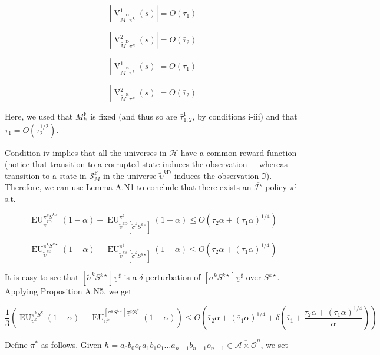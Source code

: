 \documentclass[a4paper]{article}
\newcommand{\Comment}[1]{}
\newcommand{\AP}[1]{\left(#1\right)}
\newcommand{\AB}[1]{\left[#1\right]}
\newcommand{\Abs}[1]{\left\vert #1 \right\vert}
\newcommand{\Ob}{\mathcal{O}}
\newcommand{\A}{\mathcal{A}}
\newcommand{\St}{\mathcal{S}}
\newcommand{\In}{\mathcal{I}}
\newcommand{\Hy}{\mathcal{H}}
\newcommand{\RMD}{\mathrm{D}}
\newcommand{\RME}{\mathrm{E}}
\newcommand{\RMF}{\mathrm{F}}
\newcommand{\SF}{\St^{\RMF}}
\newcommand{\V}{\operatorname{V}}
\newcommand{\EU}{\operatorname{EU}}
\begin{document}
$$\Abs{\V_{\tilde{M}^\RMD\pi^k}^1(s)} = O\AP{\bar{\tau}_1}$$

$$\Abs{\V_{\tilde{M}^\RMD\pi^k}^2(s)} = O\AP{\bar{\tau}_2}$$

$$\Abs{\V_{\tilde{M}^\RME\pi^k}^1(s)} = O\AP{\bar{\tau}_1}$$

$$\Abs{\V_{\tilde{M}^\RME\pi^k}^2(s)} = O\AP{\bar{\tau}_2}$$

Here, we used that $M^\RMF_k$ is fixed (and thus so are $\bar{\tau}_{1,2}^\RMF$, by conditions i-iii) and that $\bar{\tau}_1 = O\AP{\bar{\tau}_2^{1/2}}$.

Condition iv implies that all the universes in $\Hy$ have a common reward function (notice that transition to a corrupted state induces the observation $\bot$ whereas transition to a state in $\SF_M$ in the universe $\tilde{\upsilon}^{k\RMD}$ induces the observation $\Im$). Therefore, we can use Lemma A.N1 to conclude that there exists an $\overline{\In^\star}$-policy $\pi^\sharp$ s.t.

$$\EU_{\tilde{\upsilon}^{k\RMD}}^{\pi^kS^{k\star}}(1-\alpha) - \EU_{\overline{\tilde{\upsilon}^{k\RMD}}\AB{\tilde{\sigma}^k S^{k\star}}}^{\pi^\sharp}(1-\alpha) \leq O\AP{\bar{\tau}_2 \alpha + (\bar{\tau}_1 \alpha)^{1/4}}$$

$$\EU_{\tilde{\upsilon}^{k\RME}}^{\pi^kS^{k\star}}(1-\alpha) - \EU_{\overline{\tilde{\upsilon}^{k\RME}}\AB{\tilde{\sigma}^k S^{k\star}}}^{\pi^\sharp}(1-\alpha) \leq O\AP{\bar{\tau}_2 \alpha + (\bar{\tau}_1 \alpha)^{1/4}}$$

It is easy to see that $\AB{\tilde{\sigma}^k S^{k\star}}\underline{\pi}^\sharp$ is a $\delta$-perturbation of $\AB{\sigma^k S^{k\star}}\underline{\pi}^\sharp$ over $S^{k\star}$. Applying Proposition A.N5, we get

$$\frac{1}{3}\AP{\EU_{\upsilon^k}^{\pi^k S^{k}}(1-\alpha)-\EU_{\upsilon^k}^{\AB{\sigma^k S^{k\star}}\underline{\pi}^\sharp\Re^*}(1-\alpha)} \leq O\AP{\bar{\tau}_2 \alpha + (\bar{\tau}_1 \alpha)^{1/4} + \delta\AP{\bar{\tau}_1+\frac{\bar{\tau}_2 \alpha + (\bar{\tau}_1 \alpha)^{1/4}}{\alpha}}}$$

\Comment{Given $h = a_0 b_0 o_0 a_1 b_1 o_1 \ldots a_{n-1} b_{n-1} o_{n-1} \in \overline{\A \times \Ob}^n$, we use the notation 

$$\bar{\Re}^*h := a_0 b_0 o_0 \Re a_1 b_1 o_1 \Re \ldots a_{n-1} b_{n-1} o_{n-1} \Re \in \overline{\A \times \Ob'}^n$$

We define $\pi^*$ as by $\pi^*(h) := \pi^\star\AP{\bar{\Re}^*h}$.}

Define $\pi^*$ as follows. Given $h = a_0 b_0 o_0 a_1 b_1 o_1 \ldots a_{n-1} b_{n-1} o_{n-1} \in \overline{\A \times \Ob}^n$, we set
\end{document}
